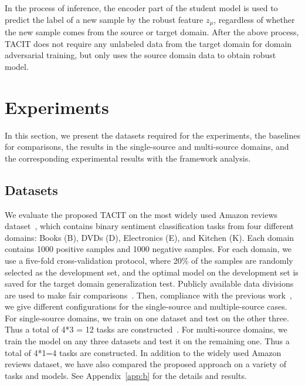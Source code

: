 \documentclass[letterpaper]{article} %
\begin{document}
In the process of inference, the encoder part of the student model is used to predict the label of a new sample by the robust feature $z_\mu$, regardless of whether the new sample comes from the source or target domain. After the above process, TACIT does not require any unlabeled data from the target domain for domain adversarial training, but only uses the source domain data to obtain robust model.

\section{Experiments}\label{sec:exp}
In this section, we present the datasets required for the experiments, the baselines for comparisons, the results in the single-source and multi-source domains, and the corresponding experimental results with the framework analysis.

\subsection{Datasets}\label{sec:data}

We evaluate the proposed TACIT on the most widely used Amazon reviews dataset~\cite{BlitzerDP07}, which contains binary sentiment classification tasks from four different domains: Books (B), DVDs (D), Electronics (E), and Kitchen (K). Each domain contains 1000 positive samples and 1000 negative samples. For each domain, we use a five-fold cross-validation protocol, where 20\% of the samples are randomly selected as the development set, and the optimal model on the development set is saved for the target domain generalization test. Publicly available data divisions are used to make fair comparisons~\cite{Ben-DavidRR20}. Then, compliance with the previous work~\cite{WuS22}, we give different configurations for the single-source and multiple-source cases. For single-source domains, we train on one dataset and test on the other three. Thus a total of 4*3 = 12 tasks are constructed~\cite{ZiserR18}. For multi-source domains, we train the model on any three datasets and test it on the remaining one. Thus a total of 4*1=4 tasks are constructed. In addition to the widely used Amazon reviews dataset, we have also compared the proposed approach on a variety of tasks and models. See Appendix~\ref{app:b} for the details and results.
\end{document}
